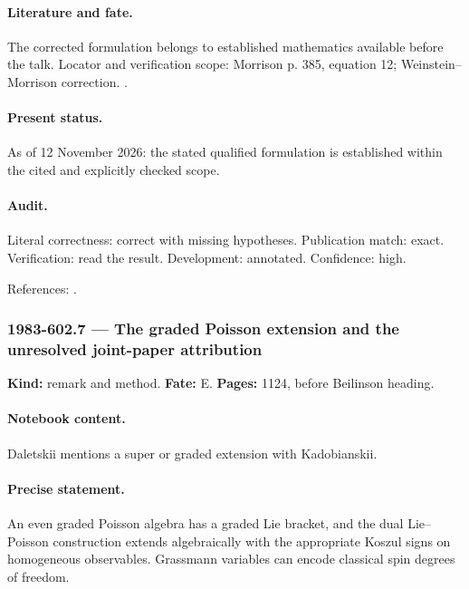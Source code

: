 \paragraph{Literature and fate.} The corrected formulation belongs to established mathematics available before the talk. Locator and verification scope: Morrison p. 385, equation 12; Weinstein--Morrison correction. \cite{morrison1980maxwell,weinsteinmorrison1981comments}.

\paragraph{Present status.} As of 12 November 2026: the stated qualified formulation is established within the cited and explicitly checked scope.

\paragraph{Audit.} Literal correctness: correct with missing hypotheses. Publication match: exact. Verification: read the result. Development: annotated. Confidence: high.

\noindent References: \citep{morrison1980maxwell,weinsteinmorrison1981comments}.\par

\subsubsection{1983-602.7 --- The graded Poisson extension and the unresolved joint-paper attribution}

\label{item:1983-602.7}

\noindent\textbf{Kind:} remark and method. \textbf{Fate:} E. \textbf{Pages:} 1124, before Beilinson heading.\par

\paragraph{Notebook content.} Daletskii mentions a super or graded extension with Kadobianskii.

\paragraph{Precise statement.} An even graded Poisson algebra has a graded Lie bracket, and the dual Lie--Poisson construction extends algebraically with the appropriate Koszul signs on homogeneous observables. Grassmann variables can encode classical spin degrees of freedom.

